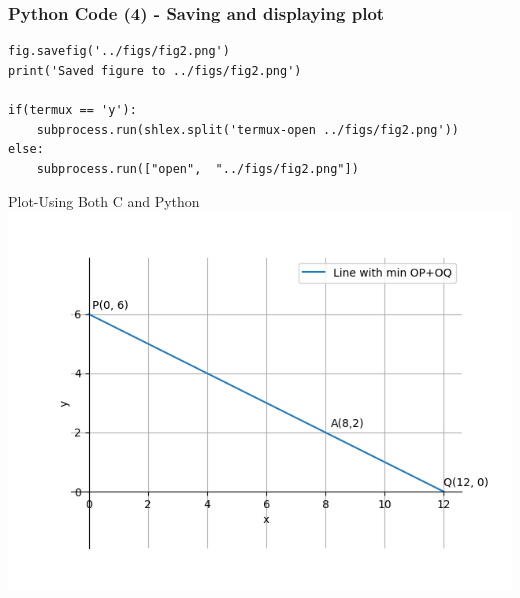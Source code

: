 \documentclass{beamer}
\begin{document}
\begin{frame}[fragile]
    \frametitle{Python Code (4) - Saving and displaying plot}
    \begin{lstlisting}
fig.savefig('../figs/fig2.png')
print('Saved figure to ../figs/fig2.png')

if(termux == 'y'):
    subprocess.run(shlex.split('termux-open ../figs/fig2.png'))
else:
    subprocess.run(["open",  "../figs/fig2.png"])
\end{lstlisting}
\end{frame}

\begin{frame}{Plot-Using Both C and Python}
    \centering
    \includegraphics[width=\columnwidth, height=0.8\textheight, keepaspectratio]{../figs/fig2.png}     
\end{frame}
\end{document}
